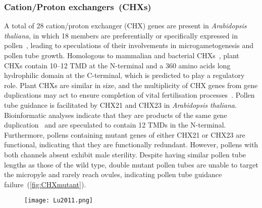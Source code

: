 \documentclass[11pt]{article}
\begin{document}
\begin{multicols*}{2}
\subsubsection{Cation/Proton exchangers~(CHXs)}
A total of 28 cation/proton exchanger (CHX) genes are present in \textit{Arabidopsis thaliana}, in which 18 members are preferentially or specifically expressed in pollen~\citep{Sze2004b}, leading to speculations of their involvements in microgametogenesis and pollen tube growth. Homologous to mammalian and bacterial CHXs~\citep{Grabov2007}, plant CHXs contain 10--12 TMD at the N-terminal and a 360 amino acids long hydrophilic domain at the C-terminal, which is predicted to play a regulatory role. Plant CHXs are similar in size, and the multiplicity of CHX genes from gene duplications may act to ensure completion of vital fertilisation processes~\citep{Sze2004b,Lu2011}.
\newline\newline
Pollen tube guidance is facilitated by CHX21 and CHX23 in \textit{Arabidopsis thaliana}. Bioinformatic analyses indicate that they are products of the same gene duplication~\citep{Sze2004b} and are speculated to contain 12 TMDs in the N-terminal. Furthermore, pollens containing mutant genes of either CHX21 or CHX23 are functional, indicating that they are functionally redundant. However, pollens with both channels absent exhibit male sterility. Despite having similar pollen tube lengths as those of the wild type, double mutant pollen tubes are unable to target the micropyle and rarely reach ovules, indicating pollen tube guidance failure~(\autoref{fig:CHXmutant})\citep{Lu2011}. 

\begin{figure}[H]
  \centering
    \texttt{[image: Lu2011.png]}
  \label{fig:CHXmutant}
\end{figure}


\end{multicols*}
\end{document}
